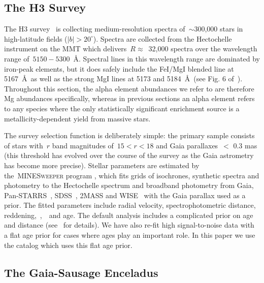 \documentclass[ms.tex]{subfiles}
\begin{document}
\subsection{The H3 Survey}
\label{sec:h3:survey}

The H3 survey~\citep{Conroy2019} is collecting medium-resolution spectra
of~$\sim$300,000 stars in high-latitude fields ($\left|b\right| > 20^\circ$).
Spectra are collected from the Hectochelle instrument on the MMT
\citep{Szentgyorgyi2011} which delivers~$R \approx$~32,000 spectra over the
wavelength range of~$5150 - 5300$~\AA.
Spectral lines in this wavelength range are dominated by iron-peak elements,
but it does safely include the FeI/MgI blended line at 5167~\AA~as well as
the strong MgI lines at 5173 and 5184~\AA~(see Fig. 6 of~\citealt{Conroy2019}).
Throughout this section, the alpha element abundances we refer to are therefore
Mg abundances specifically, whereas in previous sections an alpha element
refers to any species where the only statistically significant enrichment
source is a metallicity-dependent yield from massive stars.
\par
The survey selection function is deliberately simple: the primary sample
consists of stars with~$r$ band magnitudes of~$15 < r < 18$ and Gaia
\citet{Gaia2016} parallaxes~$<$ 0.3 mas (this threshold has evolved over the
course of the survey as the Gaia astrometry has become more precise).
Stellar parameters are estimated by the~\textsc{MINESweeper} program
\citep{Cargile2020}, which fits grids of isochrones, synthetic spectra and
photometry to the Hectochelle spectrum and broadband photometry from Gaia,
Pan-STARRS~\citep{Chambers2016}, SDSS~\citep{York2000}, 2MASS
\citep{Skrutskie2006} and WISE~\citep{Wright2010} with the Gaia parallax
used as a prior.
The fitted parameters include radial velocity, spectrophotometric distance,
reddening,~\feh,~\afe~and age.
The default analysis includes a complicated prior on age and distance
(see~\citealt{Cargile2020} for details).
We have also re-fit high signal-to-noise data with a flat age prior for cases
where ages play an important role.
In this paper we use the catalog which uses this flat age prior.


\subsection{The Gaia-Sausage Enceladus}
\label{sec:h3:gse}
\end{document}
